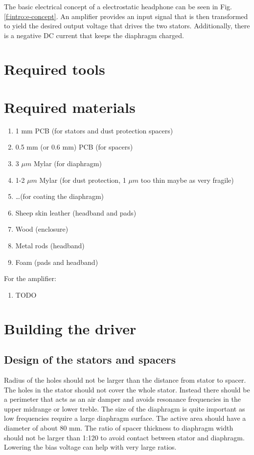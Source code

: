 \documentclass{article}
\begin{document}
The basic electrical concept of a electrostatic headphone can be seen in Fig. \ref{f:intro:e-concept}. An amplifier provides an input signal that is then transformed to yield the desired output voltage that drives the two stators. Additionally, there is a negative DC current that keeps the diaphragm charged.

\section{Required tools}
\label{s:tools}

\section{Required materials}
\label{s:materials}
\begin{enumerate}
    \item 1 mm PCB (for stators and dust protection spacers)
    \item 0.5 mm (or 0.6 mm) PCB (for spacers)
    \item 3 $\mu m$ Mylar (for diaphragm)
    \item 1-2 $\mu m$ Mylar (for dust protection, 1 $\mu m$ too thin maybe as very fragile) %
    \item \ldots (for coating the diaphragm) %
    \item Sheep skin leather (headband and pads)
    \item Wood (enclosure)
    \item Metal rods (headband)
    \item Foam (pads and headband)
\end{enumerate}

For the amplifier:
\begin{enumerate}
    \item TODO
\end{enumerate}

\section{Building the driver}
\label{s:driver}

\subsection{Design of the stators and spacers}
\label{s:driver:design}
Radius of the holes should not be larger than the distance from stator to spacer. The holes in the stator should not cover the whole stator. Instead there should be a perimeter that acts as an air damper and avoids resonance frequencies in the upper midrange or lower treble. The size of the diaphragm is quite important as low frequencies require a large diaphragm surface. The active area should have a diameter of about 80 mm. The ratio of spacer thickness to diaphragm width should not be larger than 1:120 to avoid contact between stator and diaphragm. Lowering the bias voltage can help with very large ratios.
\end{document}
